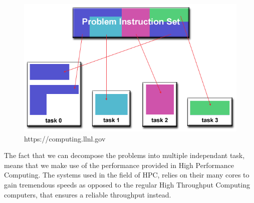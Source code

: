 \begin{figure}[htbp]\label{fun}
\includegraphics[width=\textwidth]{Analysis/Supercomputing/functional_decomp.png}
\caption{https://computing.llnl.gov}
\end{figure}

The fact that we can decompose the problems into multiple independant task, means that we make use of the performance provided in High Performance Computing. The systems used in the field of HPC, relies on their many cores to gain tremendous speeds as opposed to the regular High Throughput Computing computers, that ensures a reliable throughput instead.